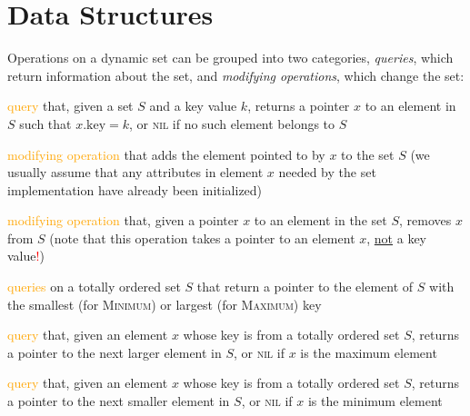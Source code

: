 \section{Data Structures}
\label{sec:data_structures}

Operations on a dynamic set can be grouped into two categories, \textit{queries}, which return information about the set, and \textit{modifying operations}, which change the set:
\begin{description}[style=nextline, font={$\; \bullet$~\normalfont}]
\item[\textsc{Search$(S, k)$}]
\textcolor{orange}{query} that, given a set $S$ and a key value $k$, returns a pointer $x$ to an element in $S$ such that $x.\text{key} = k$, or \textsc{nil} if no such element belongs to $S$
\item[\textsc{Insert$(S, x)$}]
\textcolor{orange}{modifying operation} that adds the element pointed to by $x$ to the set $S$ (we usually assume that any attributes in element $x$ needed by the set implementation have already been initialized)
\item[\textsc{Delete$(S, x)$}]
\textcolor{orange}{modifying operation} that, given a pointer $x$ to an element in the set $S$, removes $x$ from $S$ (note that this operation takes a pointer to an element $x$, \underline{not} a key value\textcolor{red}{!})
\item[\textsc{Minimum$(S)$} and \textsc{Maximum$(S)$}]
\textcolor{orange}{queries} on a totally ordered set $S$ that return a pointer to the element of $S$ with the smallest (for \textsc{Minimum}) or largest (for \textsc{Maximum}) key
\item[\textsc{Successor$(S, x)$}]
\textcolor{orange}{query} that, given an element $x$ whose key is from a totally ordered set $S$, returns a pointer to the next larger element in $S$, or \textsc{nil} if $x$ is the maximum element
\item[\textsc{Predecessor$(S, x)$}]
\textcolor{orange}{query} that, given an element $x$ whose key is from a totally ordered set $S$, returns a pointer to the next smaller element in $S$, or \textsc{nil} if $x$ is the minimum element
\end{description}



